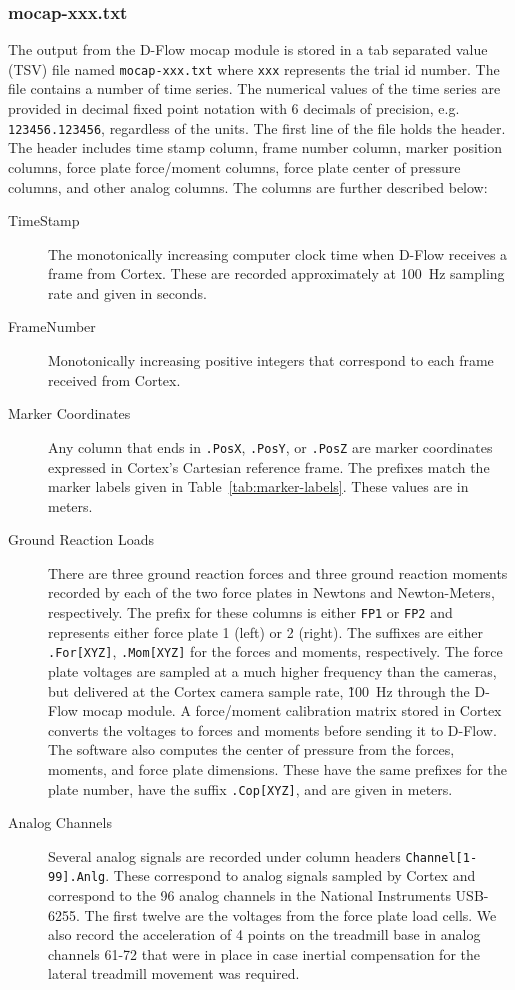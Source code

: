 \documentclass[fleqn,12pt]{wlpeerj}
\begin{document}
\subsubsection*{mocap-xxx.txt}
%
The output from the D-Flow mocap module is stored in a tab separated value
(TSV) file named \verb+mocap-xxx.txt+ where \verb+xxx+ represents the trial id
number. The file contains a number of time series. The numerical values of the
time series are provided in decimal fixed point notation with 6 decimals of
precision, e.g. \verb|123456.123456|, regardless of the units. The first line
of the file holds the header. The header includes time stamp column, frame
number column, marker position columns, force plate force/moment columns, force
plate center of pressure columns, and other analog columns. The columns are
further described below:
%
\begin{description}
  \item[TimeStamp] The monotonically increasing computer clock time when D-Flow
    receives a frame from Cortex. These are recorded approximately at
    100~\si{\hertz} sampling rate and given in seconds.
  \item[FrameNumber] Monotonically increasing positive integers that correspond
    to each frame received from Cortex.
  \item[Marker Coordinates] Any column that ends in \verb+.PosX+, \verb+.PosY+,
    or \verb+.PosZ+ are marker coordinates expressed in Cortex's Cartesian
    reference frame. The prefixes match the marker labels given in
    Table~\ref{tab:marker-labels}. These values are in meters.
  \item[Ground Reaction Loads] There are three ground reaction forces and three
    ground reaction moments recorded by each of the two force plates in Newtons
    and Newton-Meters, respectively. The prefix for these columns is either
    \verb+FP1+ or \verb+FP2+ and represents either force plate 1 (left) or 2
    (right). The suffixes are either \verb+.For[XYZ]+, \verb+.Mom[XYZ]+ for the
    forces and moments, respectively. The force plate voltages are sampled at a
    much higher frequency than the cameras, but delivered at the Cortex camera
    sample rate, \~100~\si{\hertz} through the D-Flow mocap module. A
    force/moment calibration matrix stored in Cortex converts the voltages to
    forces and moments before sending it to D-Flow. The software also computes
    the center of pressure from the forces, moments, and force plate
    dimensions. These have the same prefixes for the plate number, have the
    suffix \verb+.Cop[XYZ]+, and are given in meters.
  \item[Analog Channels] Several analog signals are recorded under column
    headers \verb+Channel[1-99].Anlg+. These correspond to analog signals
    sampled by Cortex and correspond to the 96 analog channels in the National
    Instruments USB-6255. The first twelve are the voltages from the
    force plate load cells. We also record the acceleration of 4 points on the
    treadmill base in analog channels 61-72 that were in place in case inertial
    compensation for the lateral treadmill movement was required.
\end{description}
\end{document}
